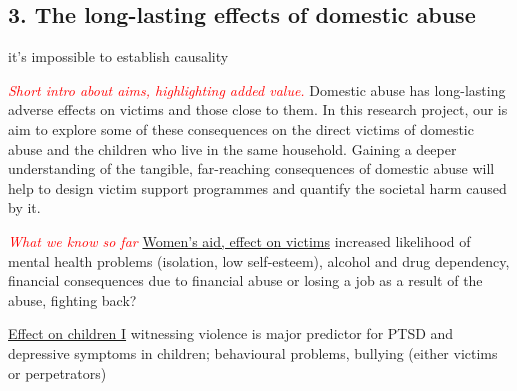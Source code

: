 \documentclass[11pt, a4paper]{article}
\begin{document}

%
%
%
%


\newpage

\subsection*{3. The long-lasting effects of domestic abuse}

it's impossible to establish causality

 \textcolor{red}{\textit{Short intro about aims, highlighting added value.}}
Domestic abuse has long-lasting adverse effects on victims and those close to them. In this research project, our is aim to explore some of these consequences on the direct victims of domestic abuse and the children who live in the same household. Gaining a deeper understanding of the tangible, far-reaching consequences of domestic abuse will help to design victim support programmes and quantify the societal harm caused by it.


\textcolor{red}{\textit{What we know so far}}
\href{https://www.womensaid.org.uk/information-support/what-is-domestic-abuse/the-nature-and-impact-of-domestic-abuse/}{Women's aid, effect on victims} increased likelihood of mental health problems (isolation, low self-esteem), alcohol and drug dependency, financial consequences due to financial abuse or losing a job as a result of the abuse, fighting back?

\href{https://uksaysnomore.org/effects-of-domestic-abuse-on-children/}{Effect on children I} witnessing violence is major predictor for PTSD and depressive symptoms in children; behavioural problems, bullying (either victims or perpetrators)
\end{document}

